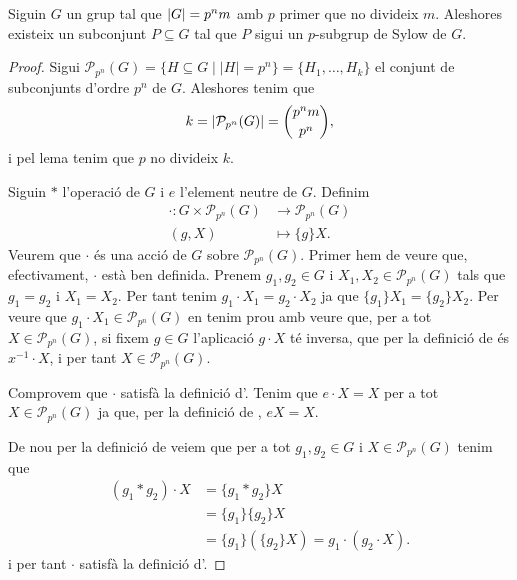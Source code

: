 \documentclass[../../Main.tex]{subfiles}
\begin{document}
	\begin{theorem}
		\label{thm:Primer Teorema de Sylow}
		Siguin \(G\) un grup tal que \(\abs{G}=p^{n}m\) amb \(p\) primer que no divideix \(m\). Aleshores existeix un subconjunt \(P\subseteq G\) tal que \(P\) sigui un \(p\)-subgrup de Sylow de \(G\).
		\begin{proof} %
			Sigui \(\mathcal{P}_{p^{n}}(G)=\{H\subseteq G\mid\lvert H\rvert=p^{n}\}=\{H_{1},\dots,H_{k}\}\) el conjunt de subconjunts d'ordre \(p^{n}\) de \(G\). Aleshores tenim que
			\begin{displaymath}
			k=\abs{\mathcal{P}_{p^{n}}(G)}=\binom{p^{n}m}{p^{n}},
			\end{displaymath}
			i pel lema  tenim que \(p\) no divideix \(k\). %
			
			Siguin \(\ast\) l'operació de \(G\) i \(e\) l'element neutre de \(G\). Definim
			\begin{align}
				\label{eq:thm:Primer Teorema de Sylow 1}
				\cdot\colon G\times\mathcal{P}_{p^{n}}(G)&\longrightarrow \mathcal{P}_{p^{n}}(G)\\
				(g,X)&\longmapsto\{g\}X.\nonumber
			\end{align}
			Veurem que \(\cdot\) és una acció de \(G\) sobre \(\mathcal{P}_{p^{n}}(G)\). Primer hem de veure que, efectivament, \(\cdot\) està ben definida. Prenem \(g_{1},g_{2}\in G\) i \(X_{1},X_{2}\in \mathcal{P}_{p^{n}}(G)\) tals que \(g_{1}=g_{2}\) i \(X_{1}=X_{2}\). Per tant tenim \(g_{1}\cdot X_{1}=g_{2}\cdot X_{2}\) ja que \(\{g_{1}\}X_{1}=\{g_{2}\}X_{2}\). Per veure que \(g_{1}\cdot X_{1}\in\mathcal{P}_{p^{n}}(G)\) en tenim prou amb veure que, per a tot \(X\in\mathcal{P}_{p^{n}}(G)\), si fixem \(g\in G\) l'aplicació \(g\cdot X\) té inversa, que per la definició de  és \(x^{-1}\cdot X\), i per tant \(X\in\mathcal{P}_{p^{n}}(G)\).
			
			Comprovem que \(\cdot\) satisfà la definició d'. Tenim que \(e\cdot X=X\) per a tot \(X\in\mathcal{P}_{p^{n}}(G)\) ja que, per la definició de , \(eX=X\).
			
			De nou per la definició de  veiem que per a tot \(g_{1},g_{2}\in G\) i \(X\in\mathcal{P}_{p^{n}}(G)\) tenim que \begin{align*}
			(g_{1}\ast g_{2})\cdot X&=\{g_{1}\ast g_{2}\}X\\
			&=\{g_{1}\}\{g_{2}\}X\\
			&=\{g_{1}\}(\{g_{2}\}X)=g_{1}\cdot(g_{2}\cdot X).
			\end{align*}
			i per tant \(\cdot\) satisfà la definició d'.
			

\end{proof}
\end{theorem}
\end{document}
